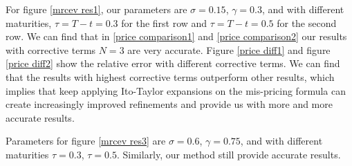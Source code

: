 For figure \ref{mrcev res1}, our parameters are $\sigma=0.15$, $\gamma=0.3$, and with different maturities, $\tau=T-t=0.3$ for the first row and $\tau=T-t=0.5$ for the second row. We can find that in \ref{price comparison1} and \ref{price comparison2} our results with corrective terms $N=3$ are very accurate. Figure \ref{price diff1} and figure \ref{price diff2} show the relative error with different corrective terms. We can find that the results with highest corrective terms outperform other results, which implies that keep applying Ito-Taylor expansions on the mis-pricing formula can create increasingly improved refinements and provide us with more and more accurate results.

Parameters for figure \ref{mrcev res3} are $\sigma=0.6$, $\gamma=0.75$, and with different maturities $\tau=0.3$, $\tau=0.5$. Similarly, our method still provide accurate results.

